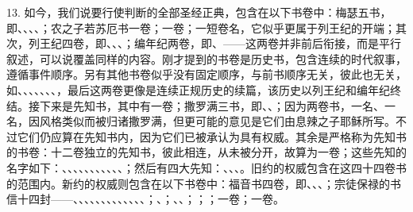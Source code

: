 13. 如今，我们说要行使判断的全部圣经正典，包含在以下书卷中：梅瑟五书，即、、、、；农之子若苏厄书一卷；一卷；一短卷名，它似乎更属于列王纪的开端；其次，列王纪四卷，即、、、；编年纪两卷，即、——这两卷并非前后衔接，而是平行叙述，可以说覆盖同样的内容。刚才提到的书卷是历史书，包含连续的时代叙事，遵循事件顺序。另有其他书卷似乎没有固定顺序，与前书顺序无关，彼此也无关，如、、、、、、、，最后这两卷更像是连续正规历史的续篇，该历史以列王纪和编年纪终结。接下来是先知书，其中有一卷；撒罗满三书，即、、；因为两卷书，一名、一名，因风格类似而被归诸撒罗满，但更可能的意见是它们由息辣之子耶稣所写。不过它们仍应算在先知书内，因为它们已被承认为具有权威。其余是严格称为先知书的书卷：十二卷独立的先知书，彼此相连，从未被分开，故算为一卷；这些先知的名字如下：、、、、、、、、、、、；然后有四大先知：、、、。旧约的权威包含在这四十四卷书的范围内。新约的权威则包含在以下书卷中：福音书四卷，即、、、；宗徒保禄的书信十四封——、、、、、、、、、、、、、；、；、、；；；一卷；一卷。\par


